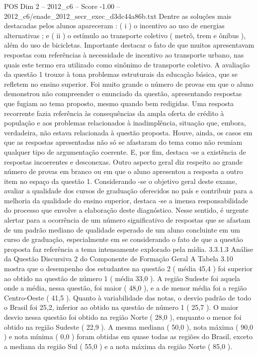 \begin{textsample}{POS Dim 2 – 2012\_c6 – Score -1.00 – 2012\_c6/enade\_2012\_secr\_exec\_d3dc44a86b.txt}
Dentre as soluções mais destacadas pelos alunos apareceram : ( i ) o incentivo ao uso de energias alternativas ; e ( ii ) o estímulo ao transporte coletivo ( metrô, trem e ônibus ), além do uso de bicicletas.
Importante destacar o fato de que muitos apresentavam respostas com referências à necessidade de incentivo ao transporte urbano, nas quais este termo era utilizado como sinônimo de transporte coletivo.
A avaliação da questão 1 trouxe à tona problemas estruturais da educação básica, que se refletem no ensino superior.
Foi muito grande o número de provas em que o aluno demonstrou não compreender o enunciado da questão, apresentando respostas que fugiam ao tema proposto, mesmo quando bem redigidas.
Uma resposta recorrente fazia referência às consequências da ampla oferta de crédito à população e aos problemas relacionados à inadimplência, situação que, embora, verdadeira, não estava relacionada à questão proposta.
Houve, ainda, os casos em que as respostas apresentadas não só se afastaram do tema como não reuniam qualquer tipo de argumentação coerente.
E, por fim, destaca -se a existência de respostas incoerentes e desconexas.
Outro aspecto geral diz respeito ao grande número de provas em branco ou em que o aluno apresentou a resposta a outro item no espaço da questão 1.
Considerando -se o objetivo geral deste exame, avaliar a qualidade dos cursos de graduação oferecidos no país e contribuir para a melhoria da qualidade do ensino superior, destaca -se a imensa responsabilidade do processo que envolve a elaboração deste diagnóstico.
Nesse sentido, é urgente alertar para a ocorrência de um número significativo de respostas que se afastam de um padrão mediano de qualidade esperado de um aluno concluinte em um curso de graduação, especialmente em se considerando o fato de que a questão proposta faz referência a tema intensamente explorado pela mídia. 3.3.1.3 Análise da Questão Discursiva 2 do Componente de Formação Geral A Tabela 3.10 mostra que o desempenho dos estudantes na questão 2 ( média 45,4 ) foi superior ao obtido na questão de número 1 ( média 33,0 ).
A região Sudeste foi aquela onde a média, nessa questão, foi maior ( 48,0 ), e a de menor média foi a região Centro-Oeste ( 41,5 ).
Quanto à variabilidade das notas, o desvio padrão de todo o Brasil foi 25,2, inferior ao obtido na questão de número 1 ( 25,7 ).
O maior desvio nessa questão foi obtido na região Norte ( 28,0 ), enquanto o menor foi obtido na região Sudeste ( 22,9 ).
A mesma mediana ( 50,0 ), nota máxima ( 90,0 ) e nota mínima ( 0,0 ) foram obtidas em quase todas as regiões do Brasil, exceto a mediana da região Sul ( 55,0 ) e a nota máxima da região Norte ( 85,0 ).

\end{textsample}
